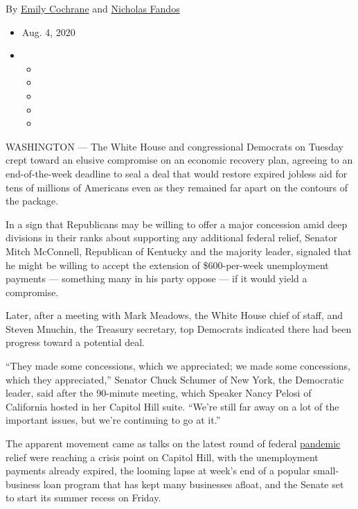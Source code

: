 By \href{https://www.nytimes.com/by/emily-cochrane}{Emily Cochrane} and
\href{https://www.nytimes.com/by/nicholas-fandos}{Nicholas Fandos}

\begin{itemize}
\item
  Aug. 4, 2020
\item
  \begin{itemize}
  \item
  \item
  \item
  \item
  \item
  \end{itemize}
\end{itemize}

WASHINGTON --- The White House and congressional Democrats on Tuesday
crept toward an elusive compromise on an economic recovery plan,
agreeing to an end-of-the-week deadline to seal a deal that would
restore expired jobless aid for tens of millions of Americans even as
they remained far apart on the contours of the package.

In a sign that Republicans may be willing to offer a major concession
amid deep divisions in their ranks about supporting any additional
federal relief, Senator Mitch McConnell, Republican of Kentucky and the
majority leader, signaled that he might be willing to accept the
extension of \$600-per-week unemployment payments --- something many in
his party oppose --- if it would yield a compromise.

Later, after a meeting with Mark Meadows, the White House chief of
staff, and Steven Mnuchin, the Treasury secretary, top Democrats
indicated there had been progress toward a potential deal.

``They made some concessions, which we appreciated; we made some
concessions, which they appreciated,'' Senator Chuck Schumer of New
York, the Democratic leader, said after the 90-minute meeting, which
Speaker Nancy Pelosi of California hosted in her Capitol Hill suite.
``We're still far away on a lot of the important issues, but we're
continuing to go at it.''

The apparent movement came as talks on the latest round of federal
\href{https://www.nytimes.com/interactive/2020/us/coronavirus-us-cases.html}{pandemic}
relief were reaching a crisis point on Capitol Hill, with the
unemployment payments already expired, the looming lapse at week's end
of a popular small-business loan program that has kept many businesses
afloat, and the Senate set to start its summer recess on Friday.

